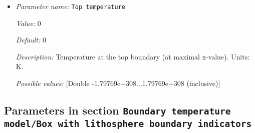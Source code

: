 \begin{itemize}
{\it Value:} 0


{\it Default:} 0


{\it Description:} Temperature at the right boundary (at maximal x-value). Units: K.


{\it Possible values:} [Double -1.79769e+308...1.79769e+308 (inclusive)]
\item {\it Parameter name:} {\tt Top temperature}
\label{parameters:Boundary temperature model/Box/Top temperature}


{\it Value:} 0


{\it Default:} 0


{\it Description:} Temperature at the top boundary (at maximal x-value). Units: K.


{\it Possible values:} [Double -1.79769e+308...1.79769e+308 (inclusive)]
\end{itemize}

\subsection{Parameters in section \tt Boundary temperature model/Box with lithosphere boundary indicators}
\label{parameters:Boundary_20temperature_20model/Box_20with_20lithosphere_20boundary_20indicators}

